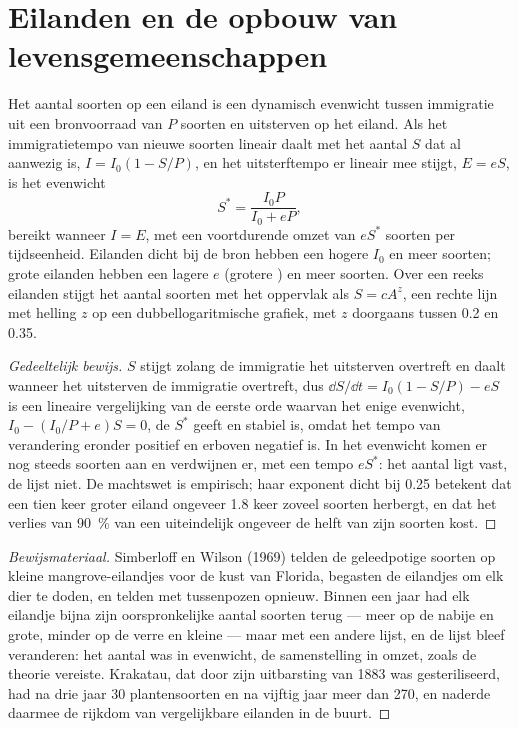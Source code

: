 \section{Eilanden en de opbouw van levensgemeenschappen}

\begin{theorem}\label{thm:b1:ecosystem-dynamics:island}
Het aantal soorten op een eiland is een dynamisch evenwicht tussen
immigratie uit een bronvoorraad van $P$ soorten en uitsterven op het eiland.
Als het immigratietempo van nieuwe soorten lineair daalt met het aantal $S$
dat al aanwezig is, $I = I_0(1 - S/P)$, en het uitsterftempo er lineair mee
stijgt, $E = eS$, is het evenwicht
\[
S^* = \frac{I_0 P}{I_0 + eP} ,
\]
bereikt wanneer $I = E$, met een voortdurende omzet van $eS^*$ soorten per
tijdseenheid. Eilanden dicht bij de bron hebben een hogere $I_0$ en meer
soorten; grote eilanden hebben een lagere $e$ (grotere ) en meer
soorten. Over een reeks eilanden stijgt het aantal soorten met het oppervlak
als $S = cA^z$, een rechte lijn met helling $z$ op een dubbellogaritmische
grafiek, met $z$ doorgaans tussen \num{0.2} en \num{0.35}.
\end{theorem}
\begin{proof}[Gedeeltelijk bewijs]
$S$ stijgt zolang de immigratie het uitsterven overtreft en daalt wanneer het
uitsterven de immigratie overtreft, dus $\dd S/\dd t = I_0(1 - S/P) - eS$
is een lineaire vergelijking van de eerste orde waarvan het enige
evenwicht, $I_0 -
(I_0/P + e)S = 0$, de $S^*$ geeft en stabiel is, omdat het tempo van
verandering eronder positief en erboven negatief is. In het evenwicht komen
er nog steeds soorten aan en verdwijnen er, met een tempo $eS^*$: het aantal
ligt vast, de lijst niet. De machtswet is empirisch; haar exponent dicht bij
\num{0.25} betekent dat een tien keer groter eiland ongeveer \num{1.8} keer
zoveel soorten herbergt, en dat het verlies van \qty{90}{\%} van een
 uiteindelijk ongeveer de helft van zijn soorten kost.
\end{proof}
\begin{proof}[Bewijsmateriaal]
Simberloff en Wilson (1969) telden de geleedpotige soorten op kleine
mangrove-eilandjes voor de kust van Florida, begasten de eilandjes om elk
dier te doden, en telden met tussenpozen opnieuw. Binnen een jaar had elk
eilandje bijna zijn oorspronkelijke aantal soorten terug --- meer op de
nabije en grote, minder op de verre en kleine --- maar met een andere lijst,
en de lijst bleef veranderen: het aantal was in evenwicht, de samenstelling
in omzet, zoals de theorie vereiste. Krakatau, dat door zijn uitbarsting van
1883 was gesteriliseerd, had na drie jaar \num{30} plantensoorten en na
vijftig jaar meer dan \num{270}, en naderde daarmee de rijkdom van
vergelijkbare eilanden in de buurt.
\end{proof}

